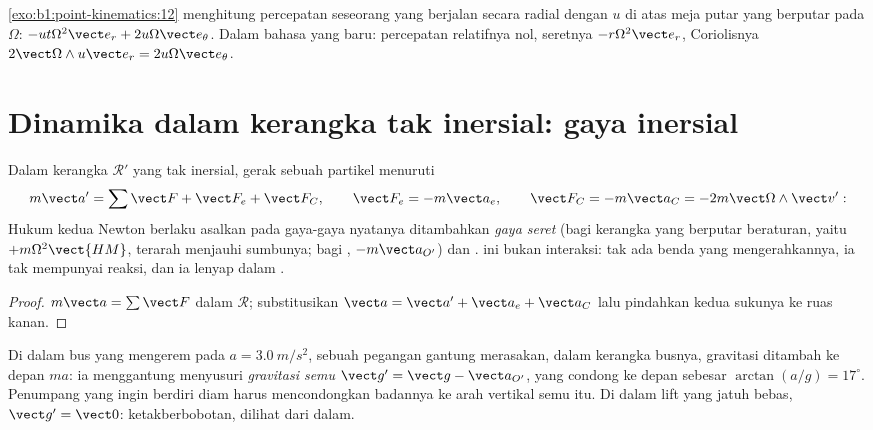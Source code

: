 \begin{example}\label{ex:b1:non-inertial-frames:turntable}
\cref{exo:b1:point-kinematics:12} menghitung percepatan seseorang yang
berjalan secara radial dengan $u$ di atas meja putar yang berputar pada $\Omega$: $-ut\Omega^2\vect e_r
+ 2u\Omega\vect e_\theta$. Dalam bahasa yang baru: percepatan relatifnya nol,
seretnya $-r\Omega^2\vect e_r$, Coriolisnya $2\vect\Omega\wedge u\vect e_r = 2u\Omega\vect e_\theta$.
\end{example}

\section{Dinamika dalam kerangka tak inersial: gaya inersial}

\begin{theorem}\label{thm:b1:non-inertial-frames:dynamics}
Dalam kerangka $\mathcal R'$ yang tak inersial, gerak sebuah partikel
menuruti
\[
m\vect a' = \sum\vect F + \vect F_e + \vect F_C, \qquad
\vect F_e = -m\vect a_e, \qquad \vect F_C = -m\vect a_C = -2m\vect\Omega\wedge\vect v' :
\]
Hukum kedua Newton berlaku asalkan pada gaya-gaya nyatanya ditambahkan
\emph{gaya seret} (bagi kerangka yang berputar beraturan, yaitu
\emph{} $+m\Omega^2\vect{HM}$, terarah menjauhi
sumbunya; bagi , $-m\vect a_{O'}$) dan \emph{}. \emph{} ini bukan interaksi: tak ada benda yang
mengerahkannya, ia tak mempunyai reaksi, dan ia lenyap dalam .
\end{theorem}

\begin{proof}
$m\vect a = \sum\vect F$ dalam  $\mathcal R$; substitusikan
$\vect a = \vect a' + \vect a_e + \vect a_C$ lalu pindahkan kedua sukunya ke
ruas kanan.
\end{proof}

\begin{example}\label{ex:b1:non-inertial-frames:bus}
Di dalam bus yang mengerem pada $a = \qty{3.0}{m/s^2}$, sebuah pegangan
gantung merasakan, dalam kerangka busnya, gravitasi ditambah 
ke depan $ma$: ia menggantung menyusuri \emph{gravitasi semu} $\vect g' = \vect g - \vect a_{O'}$, yang condong
ke depan sebesar $\arctan(a/g) = 17^\circ$. Penumpang yang ingin berdiri
diam harus mencondongkan badannya ke arah vertikal semu itu. Di dalam lift yang
jatuh bebas, $\vect g' = \vect 0$: ketakberbobotan, dilihat dari dalam.
\end{example}

